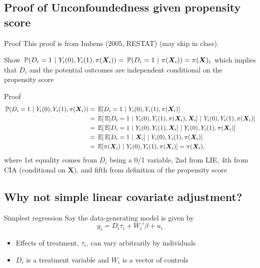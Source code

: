 \documentclass[aspectratio=169,t,11pt,table]{beamer}
\begin{document}
\subsection{Proof of Unconfoundedness given propensity score}


\begin{frame}{Proof}
  This proof is from Imbens (2005, RESTAT) (may skip in class). 
  
  Show $\prob{D_i = 1}{Y_i(0), Y_i(1), \pi(\bm{X}_i)} = \prob{D_i = 1}{\pi(\bm{X}_i)} = \pi(\bm{X})_i$ which implies that $D_i$ and the potential outcomes are independent conditional on the propensity score
\end{frame}

\begin{frame}{Proof}
  \vspace*{-2\bigskipamount}
  \begin{align*}
    \prob{D_i = 1}{Y_i(0), Y_i(1), \pi(\bm{X}_i)} 
    &= \expec{D_i = 1}{Y_i(0), Y_i(1), \pi(\bm{X}_i)} \\ 
    &= \expec{\expec{D_i = 1}{Y_i(0), Y_i(1), \pi(\bm{X}_i), \bm{X}_i}}{Y_i(0), Y_i(1), \pi(\bm{X}_i)} \\
    &= \expec{\expec{D_i = 1}{Y_i(0), Y_i(1), \bm{X}_i}}{Y_i(0), Y_i(1), \pi(\bm{X}_i)} \\
    &= \expec{\expec{D_i = 1}{\bm{X}_i}}{Y_i(0), Y_i(1), \pi(\bm{X}_i)} \\
    &= \expec{\pi(\bm{X}_i)}{Y_i(0), Y_i(1), \pi(\bm{X}_i)} = \pi(\bm{X}_i),
  \end{align*}
  where 1st equality comes from $D_i$ being a 0/1 variable, 2nd from LIE, 4th from CIA (conditional on $\bm{X}$), and fifth from definition of the propensity score
\end{frame}


\subsection{Why not simple linear covariate adjustment?}

\begin{frame}{Simplest regression}
  Say the data-generating model is given by
  $$
    y_i = D_i \tau_i + W_i' \beta + u_i
  $$
  \begin{itemize}
    \item Effects of treatment, $\tau_i$, can vary arbitrarily by individuals

    \item $D_i$ is a treatment variable and $W_i$ is a vector of controls
  \end{itemize}
\end{frame}
\end{document}
